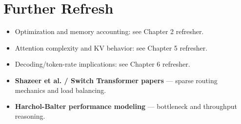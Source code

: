 \section*{Further Refresh}
\begin{itemize}[leftmargin=1.5em]
  \item Optimization and memory accounting: see Chapter 2 refresher.
  \item Attention complexity and KV behavior: see Chapter 5 refresher.
  \item Decoding/token-rate implications: see Chapter 6 refresher.
  \item \textbf{Shazeer et al. / Switch Transformer papers} --- sparse routing mechanics and load balancing.
  \item \textbf{Harchol-Balter performance modeling} --- bottleneck and throughput reasoning.
\end{itemize}
